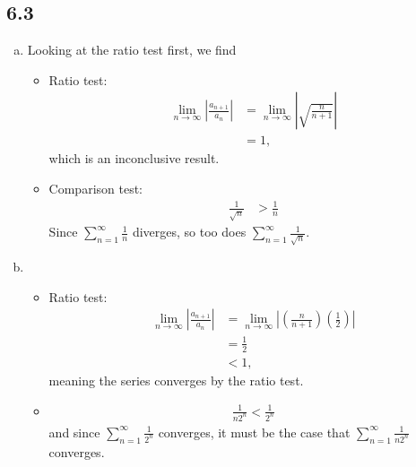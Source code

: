 \documentclass[10pt]{mypackage}
\begin{document}
\subsection{6.3}%
\begin{enumerate}[(a)]
  \item Looking at the ratio test first, we find
    \begin{itemize}
      \item Ratio test:
    \begin{align*}
      \lim_{n\rightarrow\infty}\left\vert \frac{a_{n+1}}{a_n} \right\vert &= \lim_{n\rightarrow\infty}\left\vert \sqrt{\frac{n}{n+1}} \right\vert\\
                                                                          &= 1,
    \end{align*}
    which is an inconclusive result.
      \item Comparison test:
        \begin{align*}
          \frac{1}{\sqrt{n}} &> \frac{1}{n} \tag*{$\forall n\geq 1$.}
        \end{align*}
        Since $\sum_{n=1}^{\infty}\frac{1}{n}$ diverges, so too does $\sum_{n=1}^{\infty}\frac{1}{\sqrt{n}}$.
    \end{itemize}
  \item 
    \begin{itemize}
      \item Ratio test:
        \begin{align*}
          \lim_{n\rightarrow\infty}\left\vert \frac{a_{n+1}}{a_n} \right\vert &= \lim_{n\rightarrow\infty}\left\vert \left(\frac{n}{n+1}\right)\left(\frac{1}{2}\right) \right\vert\\
                                                                              &= \frac{1}{2}\\
                                                                              &< 1,
        \end{align*}
        meaning the series converges by the ratio test.
      \item 
        \begin{align*}
          \frac{1}{n2^n} < \frac{1}{2^n} \tag*{for all $n\geq 1$,}
        \end{align*}
        and since $\sum_{n=1}^{\infty}\frac{1}{2^n}$ converges, it must be the case that $\sum_{n=1}^{\infty}\frac{1}{n2^n}$ converges.
    \end{itemize}
\end{enumerate}
\end{document}
